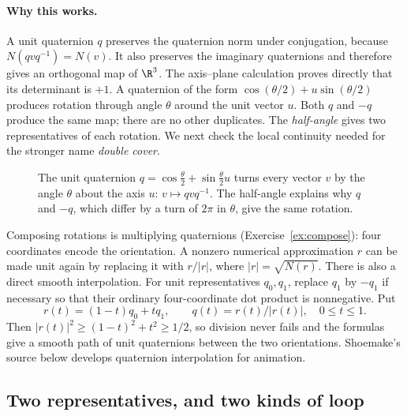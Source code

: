 \paragraph{Why this works.}
A unit quaternion $q$ preserves the quaternion norm under conjugation, because $N(qvq^{-1})=N(v)$. It also preserves the imaginary quaternions and therefore gives an orthogonal map of $\R^3$. The axis--plane calculation proves directly that its determinant is $+1$. A quaternion of the form $\cos(\theta/2)+u\sin(\theta/2)$ produces rotation through angle $\theta$ around the unit vector $u$. Both $q$ and $-q$ produce the same map; there are no other duplicates. The \emph{half-angle} gives two representatives of each rotation. We next check the local continuity needed for the stronger name \emph{double cover}.

\begin{figure}[ht]
\centering
{}
\caption{The unit quaternion $q=\cos\frac\theta2+\sin\frac\theta2u$ turns every vector $v$ by the angle $\theta$ about the axis $u$: $v\mapsto qvq^{-1}$. The half-angle explains why $q$ and $-q$, which differ by a turn of $2\pi$ in $\theta$, give the same rotation.}
\label{fig:rotation}
\end{figure}

Composing rotations is multiplying quaternions (Exercise~\ref{ex:compose}):
four coordinates encode the orientation. A nonzero numerical approximation
$r$ can be made unit again by replacing it with $r/|r|$, where
$|r|=\sqrt{N(r)}$.
There is also a direct smooth interpolation. For unit representatives
$q_0,q_1$, replace $q_1$ by $-q_1$ if necessary so that their ordinary
four-coordinate dot product is nonnegative. Put
\[
r(t)=(1-t)q_0+tq_1,\qquad q(t)=r(t)/|r(t)|,\quad0\le t\le1.
\]
Then $|r(t)|^2\ge(1-t)^2+t^2\ge1/2$, so division never fails and the
formulas give a smooth path of unit quaternions between the two orientations.
Shoemake's source below develops quaternion interpolation for animation.

\subsection*{Two representatives, and two kinds of loop}

